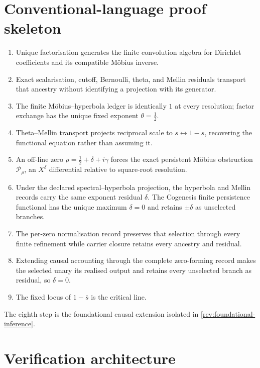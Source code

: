 \documentclass[11pt,a4paper]{article}
\theoremstyle{definition}
\begin{document}
\section{Conventional-language proof skeleton}
\label{sec:conventional-skeleton}

\begin{enumerate}[label=\textbf{\arabic*.},leftmargin=*]
  \item Unique factorisation generates the finite convolution algebra for
        Dirichlet coefficients and its compatible Möbius inverse.
  \item Exact scalarisation, cutoff, Bernoulli, theta, and Mellin residuals
        transport that ancestry without identifying a projection with its
        generator.
  \item The finite Möbius--hyperbola ledger is identically $1$ at every
        resolution; factor exchange has the unique fixed exponent
        $\theta=\tfrac12$.
  \item Theta--Mellin transport projects reciprocal scale to
        $s\leftrightarrow1-s$, recovering the functional equation rather than
        assuming it.
  \item An off-line zero
        $\rho=\tfrac12+\delta+i\gamma$ forces the exact persistent Möbius
        obstruction $\mathcal P_\rho$, an $X^\delta$ differential relative to
        square-root resolution.
  \item Under the declared spectral--hyperbola projection, the hyperbola and
        Mellin records carry the same exponent residual $\delta$. The Cogenesis
        finite persistence functional has the
        unique maximum $\delta=0$ and retains $\pm\delta$ as unselected
        branches.
  \item The per-zero normalisation record preserves that selection through
        every finite refinement while carrier closure retains every ancestry
        and residual.
  \item Extending causal accounting through the complete zero-forming record
        makes the selected unary its realised output and retains every
        unselected branch as residual, so $\delta=0$.
  \item The fixed locus of $1-\overline{s}$ is the critical line.
\end{enumerate}
The eighth step is the foundational causal extension isolated in
\cref{rev:foundational-inference}.

\section{Verification architecture}
\label{sec:verification}
\end{document}
